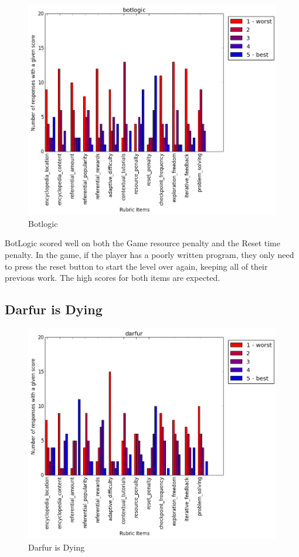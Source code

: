 				\begin{figure}[] 
				\centering 
				\includegraphics[width=\textwidth, height=.4\textheight, keepaspectratio=true]{botlogic_scores.png} 
				\caption{Botlogic}
				\end{figure}

				BotLogic scored well on both the Game resource penalty and the Reset time penalty. In the game, if the player has a poorly written program, they only need to press the reset button to start the level over again, keeping all of their previous work. The high scores for both items are expected.

			\subsection{Darfur is Dying}

				\begin{figure}[] 
				\centering 
				\includegraphics[width=\textwidth, height=.4\textheight, keepaspectratio=true]{darfur_scores.png} 
				\caption{Darfur is Dying}
				\end{figure}

